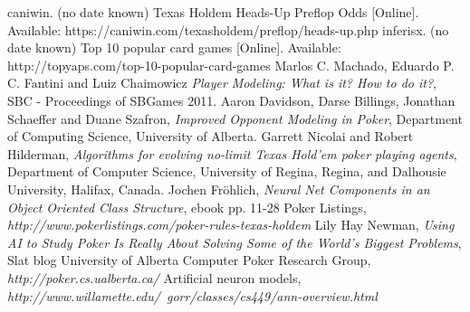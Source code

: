 \begin{thebibliography}{100} 
 caniwin. (no date known) Texas Holdem Heads-Up Preflop Odds [Online]. Available: https://caniwin.com/texasholdem/preflop/heads-up.php
 inferisx. (no date known) Top 10 popular card games [Online]. Available: http://topyaps.com/top-10-popular-card-games
 Marlos C. Machado, Eduardo P. C. Fantini and Luiz Chaimowicz \emph{Player Modeling: What is it? How to do it?}, SBC - Proceedings of SBGames 2011.
 Aaron Davidson, Darse Billings, Jonathan Schaeffer and Duane Szafron, \emph{Improved Opponent Modeling in Poker},
Department of Computing Science, University of Alberta.
 Garrett Nicolai and Robert Hilderman, \emph{Algorithms for evolving no-limit Texas Hold'em poker playing agents}, Department of Computer Science, University of Regina, Regina, and Dalhousie University, Halifax, Canada.
 Jochen Fröhlich, \emph {Neural Net Components in an Object Oriented Class Structure}, 
ebook pp. 11-28
 Poker Listings, \emph {http://www.pokerlistings.com/poker-rules-texas-holdem}
 Lily Hay Newman, \emph{Using AI to Study Poker Is Really About Solving Some of the World’s Biggest Problems}, 
Slat blog
 University of Alberta Computer Poker Research Group, \emph{http://poker.cs.ualberta.ca/}
 Artificial neuron models, \emph{http://www.willamette.edu/~gorr/classes/cs449/ann-overview.html}
\end{thebibliography}